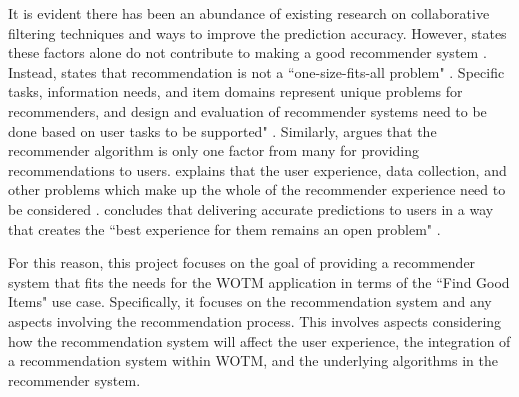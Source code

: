It is evident there has been an abundance of existing research on collaborative filtering techniques and ways to improve the prediction accuracy. However, \citeauthor{schafer2007collaborative} \cite{interface} states these factors alone do not contribute to making a good recommender system \cite{schafer2007collaborative}. Instead, \citeauthor{schafer2007collaborative} \cite{interface} states that recommendation is not a ``one-size-fits-all problem"  \cite{schafer2007collaborative}. Specific tasks, information needs, and item domains represent unique problems for recommenders, and design and evaluation of recommender systems need to be done based on user tasks to be supported" \cite{schafer2007collaborative}. Similarly, \citeauthor{martin2009recsys} \cite{martin2009recsys} argues that the recommender algorithm is only one factor from many for providing recommendations to users. \citeauthor{martin2009recsys}  \cite{martin2009recsys} explains that the user experience, data collection, and other problems which make up the whole of the recommender experience need to be considered \cite{schafer2007collaborative, martin2009recsys}. \citeauthor{interface} \cite{interface} concludes that delivering accurate predictions to users in a way that creates the ``best experience for them remains an open problem" \cite{interface}. 

For this reason, this project focuses on the goal of providing a recommender system that fits the needs for the WOTM application in terms of the ``Find Good Items" use case. Specifically, it focuses on the recommendation system and any aspects involving the recommendation process. This involves aspects considering how the recommendation system will affect the user experience, the integration of a recommendation system within WOTM, and the underlying algorithms in the recommender system. 


